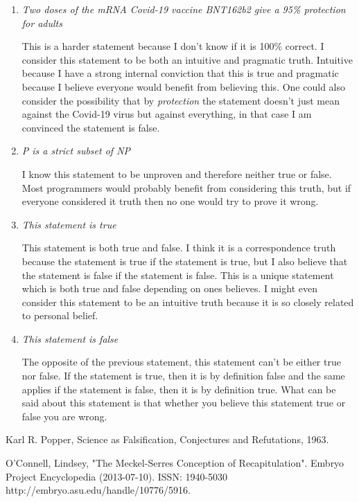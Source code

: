 \documentclass[11pt,a4paper]{article}
\begin{document}
\begin{enumerate}
	\item \textit{Two doses of the mRNA Covid-19 vaccine BNT162b2 give a 95\% protection for adults}

	This is a harder statement because I don't know if it is 100\% correct. I consider this statement to be both an intuitive and pragmatic truth. 
	Intuitive because I have a strong internal conviction that this is true and pragmatic because I believe everyone would benefit from believing this.
	One could also consider the possibility that by \textit{protection} the statement doesn't just mean against the Covid-19 virus but against everything,
	in that case I am convinced the statement is false.

	\item \textit{P is a strict subset of NP}

	I know this statement to be unproven and therefore neither true or false. Most programmers would probably benefit from considering this truth, but if 
	everyone considered it truth then no one would try to prove it wrong.

	\item \textit{This statement is true}

	This statement is both true and false. I think it is a correspondence truth because the statement is true if the statement is true, but I also believe that
	the statement is false if the statement is false. This is a unique statement which is both true and false depending on ones believes. I might even consider 
	this statement to be an intuitive truth because it is so closely related to personal belief.

	\item \textit{This statement is false}

	The opposite of the previous statement, this statement can't be either true nor false. If the statement is true, then it is by definition false and the same
	applies if the statement is false, then it is by definition true. What can be said about this statement is that whether you believe this statement true or 
	false you are wrong.

\end{enumerate}
\begin{thebibliography}{9}

	Karl R. Popper,
	Science as Falsification,
	Conjectures and Refutations,
	1963.

	O'Connell, Lindsey, "The Meckel-Serres Conception of Recapitulation". 
	Embryo Project Encyclopedia (2013-07-10).
	ISSN: 1940-5030 http://embryo.asu.edu/handle/10776/5916.

\end{thebibliography}
\end{document}
